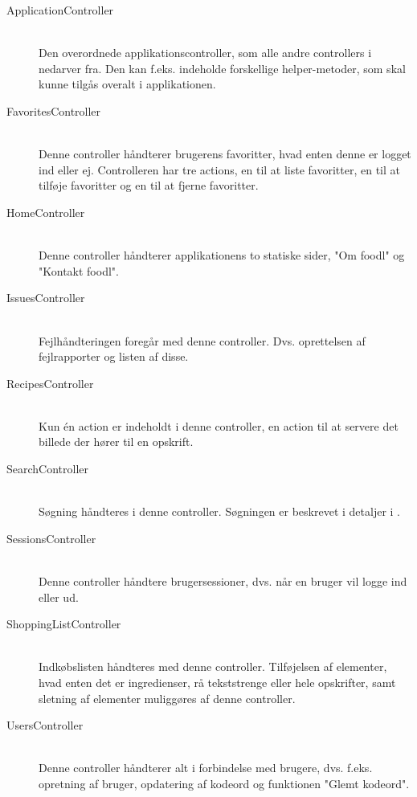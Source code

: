\begin{description}
  \item[ApplicationController] \hfill \\ 
  Den overordnede applikationscontroller, som alle andre controllers i \Foodl{} nedarver fra. Den kan f.eks. indeholde forskellige helper-metoder, som skal kunne tilgås overalt i applikationen.

  \item[FavoritesController] \hfill \\ 
  Denne controller håndterer brugerens favoritter, hvad enten denne er logget ind eller ej. Controlleren har tre actions, en til at liste favoritter, en til at tilføje favoritter og en til at fjerne favoritter.

  \item[HomeController] \hfill \\ 
  Denne controller håndterer applikationens to statiske sider, "Om foodl" og "Kontakt foodl".

  \item[IssuesController] \hfill \\ 
  Fejlhåndteringen foregår med denne controller. Dvs. oprettelsen af fejlrapporter og listen af disse.

  \item[RecipesController] \hfill \\
  Kun én action er indeholdt i denne controller, en action til at servere det billede der hører til en opskrift.

  \item[SearchController] \hfill \\
  Søgning håndteres i denne controller. Søgningen er beskrevet i detaljer i .

  \item[SessionsController] \hfill \\
  Denne controller håndtere brugersessioner, dvs. når en bruger vil logge ind eller ud.

  \item[ShoppingListController] \hfill \\
  Indkøbslisten håndteres med denne controller. Tilføjelsen af elementer, hvad enten det er ingredienser, rå tekststrenge eller hele opskrifter, samt sletning af elementer muliggøres af denne controller.

  \item[UsersController] \hfill \\
  Denne controller håndterer alt i forbindelse med brugere, dvs. f.eks. opretning af bruger, opdatering af kodeord og funktionen "Glemt kodeord".

\end{description}

